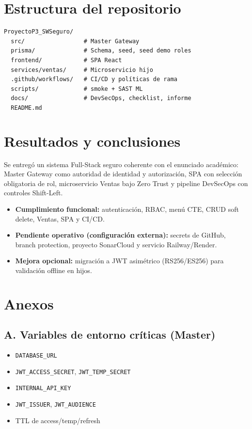 \documentclass[12pt,a4paper]{article}
\begin{document}
\section{Estructura del repositorio}
\begin{lstlisting}
ProyectoP3_SWSeguro/
  src/                 # Master Gateway
  prisma/              # Schema, seed, seed demo roles
  frontend/            # SPA React
  services/ventas/     # Microservicio hijo
  .github/workflows/   # CI/CD y políticas de rama
  scripts/             # smoke + SAST ML
  docs/                # DevSecOps, checklist, informe
  README.md
\end{lstlisting}

\section{Resultados y conclusiones}
Se entregó un sistema Full-Stack seguro coherente con el enunciado académico:
Master Gateway como autoridad de identidad y autorización, SPA con selección
obligatoria de rol, microservicio Ventas bajo Zero Trust y pipeline DevSecOps
con controles Shift-Left.

\begin{itemize}[leftmargin=1.5em]
  \item \textbf{Cumplimiento funcional:} autenticación, RBAC, menú CTE, CRUD soft delete,
        Ventas, SPA y CI/CD.
  \item \textbf{Pendiente operativo (configuración externa):} secrets de GitHub,
        branch protection, proyecto SonarCloud y servicio Railway/Render.
  \item \textbf{Mejora opcional:} migración a JWT asimétrico (RS256/ES256) para
        validación offline en hijos.
\end{itemize}

\section{Anexos}
\subsection{A. Variables de entorno críticas (Master)}
\begin{itemize}[leftmargin=1.5em]
  \item \texttt{DATABASE\_URL}
  \item \texttt{JWT\_ACCESS\_SECRET}, \texttt{JWT\_TEMP\_SECRET}
  \item \texttt{INTERNAL\_API\_KEY}
  \item \texttt{JWT\_ISSUER}, \texttt{JWT\_AUDIENCE}
  \item TTL de access/temp/refresh
\end{itemize}
\end{document}
